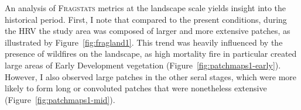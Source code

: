 


An analysis of \textsc{Fragstats} metrics at the landscape scale yields insight into the historical period. First, I note that compared to the present conditions, during the HRV the study area was composed of larger and more extensive patches, as illustrated by Figure~\ref{fig:fragland1}. This trend was heavily influenced by the presence of wildfires on the landscape, as high mortality fire in particular created large areas of Early Development vegetation (Figure~\ref{fig:patchmaps1-early}). However, I also observed large patches in the other seral stages, which were more likely to form long or convoluted patches that were nonetheless extensive (Figure~\ref{fig:patchmaps1-mid}).

